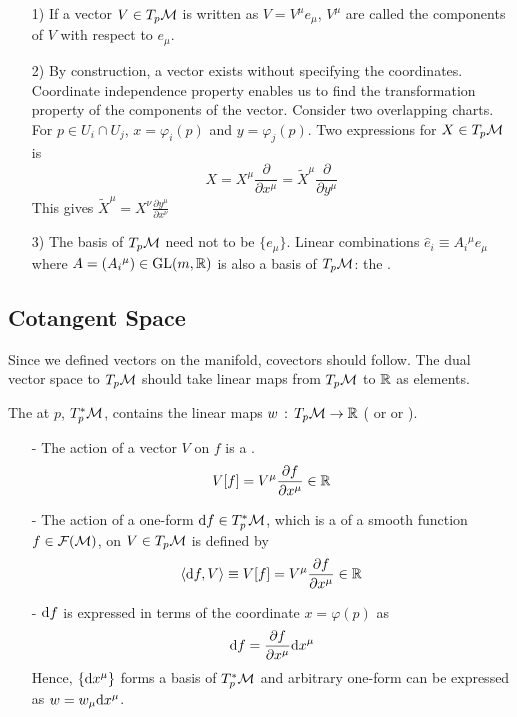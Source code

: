 \documentclass[a4paper, 10pt]{article}
\begin{document}
\begin{remark}
    \begin{itemize}
        \item[1)] If a vector $V \in T_{p}\mathcal{M}$ is written as $V = V^{\mu}e_{\mu}$, $V^{\mu}$ are called the components of $V$ with respect to $e_{\mu}$.
        \item[2)] By construction, a vector exists without specifying the coordinates. Coordinate independence property enables us to find the transformation property of the components of the vector. Consider two overlapping charts. For $p \in U_{i} \cap U_{j}$, $x = \varphi_{i}(p)$ and $y = \varphi_{j}(p)$. Two expressions for $X \in T_{p}\mathcal{M}$ is
        \[ X = X^{\mu}\frac{\partial}{\partial x^{\mu}} = \tilde{X}^{\mu}\frac{\partial}{\partial y^{\mu}} \]
        This gives $\displaystyle{\tilde{X}^{\mu} = X^{\nu}\frac{\partial y^{\mu}}{\partial x^{\nu}}}$
        \item[3)] The basis of $T_{p}\mathcal{M}$ need not to be $\{e_{\mu}\}$. Linear combinations $\hat{e}_{i} \equiv A_{i}{}^{\mu}e_{\mu}$ where $A = (A_{i}{}^{\mu}) \in \mathrm{GL}(m,\mathbb{R})$ is also a basis of $T_{p}\mathcal{M}$: the .
    \end{itemize}
\end{remark}
\newpage


\subsection{Cotangent Space}
Since we defined vectors on the manifold, covectors should follow. The dual vector space to $T_{p}\mathcal{M}$ should take linear maps from $T_{p}\mathcal{M}$ to $\mathbb{R}$ as elements.

\begin{definition}
    The  at $p$, $T_{p}^{\ast}\mathcal{M}$, contains the linear maps $w \,:\, T_{p}\mathcal{M}\rightarrow\mathbb{R}$ ( or  or ).
    \begin{itemize}
        \item[-] The action of a vector $V$ on $f$ is a .
        \[ V[f] = V^{\mu}\frac{\partial f}{\partial x^{\mu}} \in \mathbb{R} \]
        \item[-] The action of a one-form $\mathrm{d}{f} \in T_{p}^{\ast}\mathcal{M}$, which is a  of a smooth function $f \in \mathcal{F}(\mathcal{M})$, on $V \in T_{p}\mathcal{M}$ is defined by
        \[ \left<\mathrm{d}{f}, V\right> \equiv V[f] = V^{\mu}\frac{\partial f}{\partial x^{\mu}} \in \mathbb{R} \]
        \item[-] $\mathrm{d}{f}$ is expressed in terms of the coordinate $x = \varphi(p)$ as
        \[ \mathrm{d}{f} = \frac{\partial f}{\partial x^{\mu}} \mathrm{d}{x}^{\mu} \]
        Hence, $\{\mathrm{d}{x}^{\mu}\}$ forms a basis of $T_{p}^{\ast}\mathcal{M}$ and arbitrary one-form can be expressed as $w = w_{\mu}\mathrm{d}{x}^{\mu}$.
    \end{itemize}
\end{definition}
\end{document}
